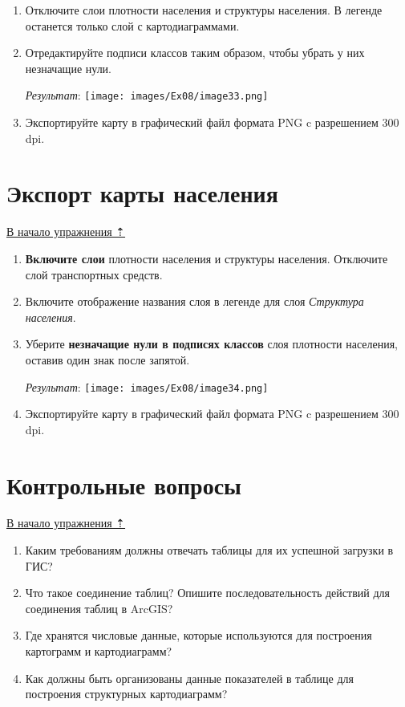 \documentclass[12pt,]{book}
\begin{document}
\begin{enumerate}
\def\labelenumi{\arabic{enumi}.}
\item
  Отключите слои плотности населения и структуры населения. В легенде останется только слой с картодиаграммами.
\item
  Отредактируйте подписи классов таким образом, чтобы убрать у них незначащие нули.

  \emph{Результат}:
  \texttt{[image: images/Ex08/image33.png]}
\item
  Экспортируйте карту в графический файл формата PNG c разрешением 300 dpi.
\end{enumerate}

\hypertarget{stat-map-economic-export-population}{%
\section{Экспорт карты населения}\label{stat-map-economic-export-population}}

\protect\hyperlink{stat-map-economic}{В начало упражнения ⇡}

\begin{enumerate}
\def\labelenumi{\arabic{enumi}.}
\item
  \textbf{Включите слои} плотности населения и структуры населения. Отключите слой транспортных средств.
\item
  Включите отображение названия слоя в легенде для слоя \emph{Структура населения}.
\item
  Уберите \textbf{незначащие нули в подписях классов} слоя плотности населения, оставив один знак после запятой.

  \emph{Результат}:
  \texttt{[image: images/Ex08/image34.png]}
\item
  Экспортируйте карту в графический файл формата PNG c разрешением 300 dpi.
\end{enumerate}

\hypertarget{stat-map-economic-export-questions}{%
\section{Контрольные вопросы}\label{stat-map-economic-export-questions}}

\protect\hyperlink{stat-map-economic}{В начало упражнения ⇡}

\begin{enumerate}
\def\labelenumi{\arabic{enumi}.}
\item
  Каким требованиям должны отвечать таблицы для их успешной загрузки в ГИС?
\item
  Что такое соединение таблиц? Опишите последовательность действий для соединения таблиц в ArcGIS?
\item
  Где хранятся числовые данные, которые используются для построения картограмм и картодиаграмм?
\item
  Как должны быть организованы данные показателей в таблице для построения структурных картодиаграмм?
\end{enumerate}
\end{document}
